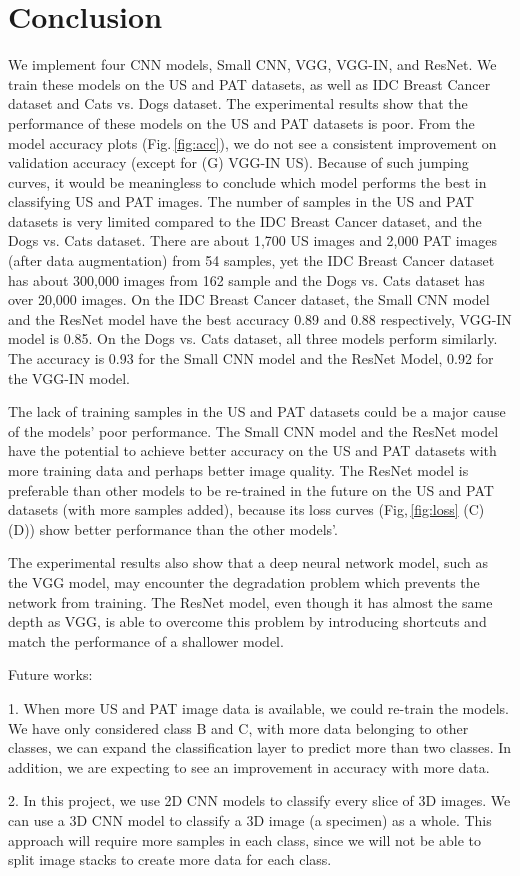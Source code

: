 \chapter{Conclusion} 
\label{conclusion}

We implement four CNN models, Small CNN, VGG, VGG-IN, and ResNet. We train these models on the US and PAT datasets, as well as IDC Breast Cancer dataset and Cats vs. Dogs dataset. The experimental results show that the performance of these models on the US and PAT datasets is poor. From the model accuracy plots (Fig.\,\ref{fig:acc}), we do not see a consistent improvement on validation accuracy (except for (G) VGG-IN US). Because of such jumping curves, it would be meaningless to conclude which model performs the best in classifying US and PAT images. The number of samples in the US and PAT datasets is very limited compared to the IDC Breast Cancer dataset, and the Dogs vs. Cats dataset. There are about 1,700 US images and 2,000 PAT images (after data augmentation) from 54 samples, yet the IDC Breast Cancer dataset has about 300,000 images from 162 sample and the Dogs vs. Cats dataset has over 20,000 images. On the IDC Breast Cancer dataset, the Small CNN model and the ResNet model have the best accuracy 0.89 and 0.88 respectively, VGG-IN model is 0.85. On the Dogs vs. Cats dataset, all three models perform similarly. The accuracy is 0.93 for the Small CNN model and the ResNet Model, 0.92 for the VGG-IN model.

The lack of training samples in the US and PAT datasets could be a major cause of the models' poor performance. The Small CNN model and the ResNet model have the potential to achieve better accuracy on the US and PAT datasets with more training data and perhaps better image quality. The ResNet model is preferable than other models to be re-trained in the future on the US and PAT datasets (with more samples added), because its loss curves (Fig,\,\ref{fig:loss} (C) (D)) show better performance than the other models'.

The experimental results also show that a deep neural network model, such as the VGG model, may encounter the degradation problem which prevents the network from training. The ResNet model, even though it has almost the same depth as VGG, is able to overcome this problem by introducing shortcuts and match the performance of a shallower model.

Future works:

1. When more US and PAT image data is available, we could re-train the models. We have only considered class B and C, with more data belonging to other classes, we can expand the classification layer to predict more than two classes. In addition, we are expecting to see an improvement in accuracy with more data.

2. In this project, we use 2D CNN models to classify every slice of 3D images. We can use a 3D CNN model \citep{tran2015learning} to classify a 3D image (a specimen) as a whole. This approach will require more samples in each class, since we will not be able to split image stacks to create more data for each class.
